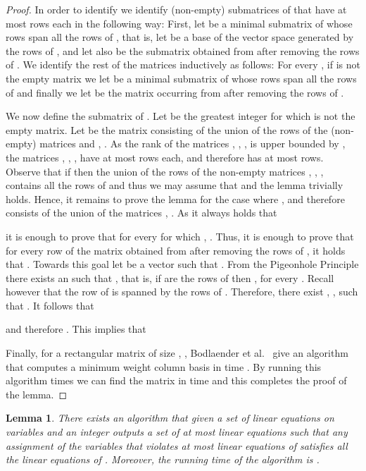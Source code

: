 \documentclass[a4paper,11pt]{article}
\newtheorem{lemma}{Lemma}
\begin{document}
\begin{proof}
In order to identify  we identify  (non-empty) submatrices of  that have at most  rows each 
 in the following way:
First, let  be a minimal submatrix of  whose rows span all the rows of , that is, let  be a base of the 
vector space generated by the rows of , and 
let also  be the submatrix obtained from  after removing the rows of .
We identify the rest of the matrices inductively as follows: For every , if  is not the empty matrix we let  
be a minimal submatrix of  whose rows span all the rows of  and finally we let  be the matrix occurring 
from  after removing the rows of .

We now define the submatrix  of . Let  be the greatest integer for which  is not the empty matrix.
Let  be the matrix consisting of the union of the rows of the (non-empty) matrices  and , . 
As the rank of the matrices , , , is upper bounded by 
, the matrices , , , have at most  rows each, and therefore  has at most  rows. 
Observe that if  then the union of the rows of the non-empty matrices , , ,
contains all the rows of  and thus we may assume that  and the lemma trivially holds.
Hence, it remains to prove the lemma for the case where , and therefore  consists of the union of the matrices , .
 As it always holds that 
 
it is enough to prove that for every  for which 
 , . Thus, it is enough to prove that for every row  
 of the matrix  obtained from  after removing the rows of , it holds that . 
 Towards this goal let  be a vector such that . 
 From the Pigeonhole Principle there exists an  such that ,
 that is, if  are the rows of  then , for every .
Recall however that the row  of  is spanned by the rows  of . 
Therefore, there exist , , such that .
It follows that 
 
and therefore .
This implies that

Finally, for a rectangular matrix of size , , Bodlaender et al.~\cite{BodlaenderCKN13} give an algorithm that computes a minimum weight column basis in
time . By running this algorithm  times we can find the matrix  in time  and this completes the proof
of the lemma. 
\end{proof}

\begin{lemma}\label{mtrx2lem}
There exists an algorithm that given a set  of linear equations on  variables and an integer 
outputs a set  of at most  linear equations such that any assignment of the variables that violates at most  linear
equations of  satisfies all the linear equations of . Moreover, the running time of the algorithm is . 
\end{lemma}
\end{document}
